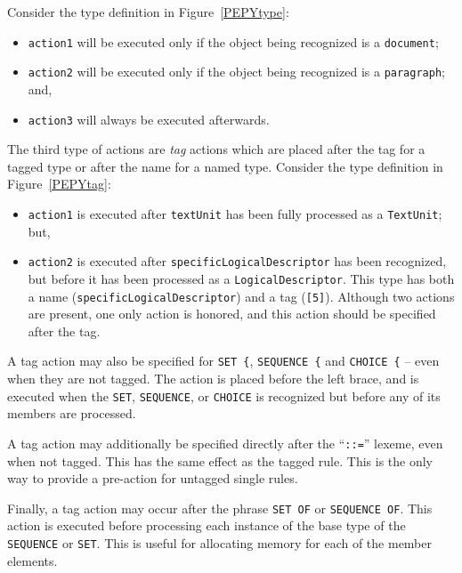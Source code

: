Consider the type definition in Figure~\ref{PEPYtype}:
\begin{itemize}
\item	\verb"action1" will be executed only if the object being recognized
is a \verb"document";

\item	\verb"action2" will be executed only if the object being recognized is
a \verb"paragraph";
and,

\item	\verb"action3" will always be executed afterwards.
\end{itemize}

The third type of actions are {\em tag\/} actions which are placed after 
the tag for a tagged type or after the name for a named type.
Consider the type definition in Figure~\ref{PEPYtag}:
\begin{itemize}
\item	\verb"action1" is executed after \verb"textUnit" has been fully
processed as a \verb"TextUnit";
but,

\item	\verb"action2" is executed after \verb"specificLogicalDescriptor"
has been recognized,
but before it has been processed as a \verb"LogicalDescriptor".
This type has both a name (\verb"specificLogicalDescriptor")
and a tag (\verb"[5]").
Although two actions are present,
one only action is honored,
and this action should be specified after the tag.
\end{itemize}

A tag action may also be specified for \verb*"SET {", \verb*"SEQUENCE {"
and \verb*"CHOICE {" -- even when they are not tagged. The action is
placed before the left brace, and is executed when the 
\verb"SET", \verb"SEQUENCE", or \verb"CHOICE" is recognized but before any of
its members are processed.

A tag action may additionally be specified directly after the
``\verb"::="'' lexeme, even when not tagged. This has the same effect as
the tagged rule. This is the only way to provide a pre-action for
untagged single rules.

Finally,
a tag action may occur after the phrase \verb*"SET OF" or \verb*"SEQUENCE OF".
This action is executed before processing each instance of the base
type of the \verb"SEQUENCE" or \verb"SET".
This is useful for allocating memory for each of the member elements.

